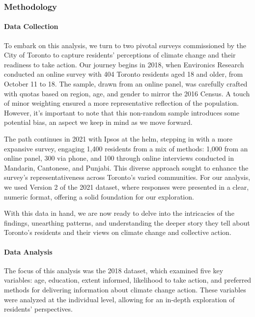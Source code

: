 \documentclass[
  letterpaper,
  DIV=11,
  numbers=noendperiod]{scrartcl}
\let\oldparagraph\paragraph
\renewcommand{\paragraph}[1]{\oldparagraph{#1}\mbox{}}
\begin{document}
\subsubsection{Methodology}\label{methodology}

\paragraph{Data Collection}\label{data-collection}

To embark on this analysis, we turn to two pivotal surveys commissioned
by the City of Toronto to capture residents' perceptions of climate
change and their readiness to take action. Our journey begins in 2018,
when Environics Research conducted an online survey with 404 Toronto
residents aged 18 and older, from October 11 to 18. The sample, drawn
from an online panel, was carefully crafted with quotas based on region,
age, and gender to mirror the 2016 Census. A touch of minor weighting
ensured a more representative reflection of the population. However,
it's important to note that this non-random sample introduces some
potential bias, an aspect we keep in mind as we move forward.

The path continues in 2021 with Ipsos at the helm, stepping in with a
more expansive survey, engaging 1,400 residents from a mix of methods:
1,000 from an online panel, 300 via phone, and 100 through online
interviews conducted in Mandarin, Cantonese, and Punjabi. This diverse
approach sought to enhance the survey's representativeness across
Toronto's varied communities. For our analysis, we used Version 2 of the
2021 dataset, where responses were presented in a clear, numeric format,
offering a solid foundation for our exploration.

With this data in hand, we are now ready to delve into the intricacies
of the findings, unearthing patterns, and understanding the deeper story
they tell about Toronto's residents and their views on climate change
and collective action.

\paragraph{Data Analysis}\label{data-analysis}

The focus of this analysis was the 2018 dataset, which examined five key
variables: age, education, extent informed, likelihood to take action,
and preferred methods for delivering information about climate change
action. These variables were analyzed at the individual level, allowing
for an in-depth exploration of residents' perspectives.
\end{document}
